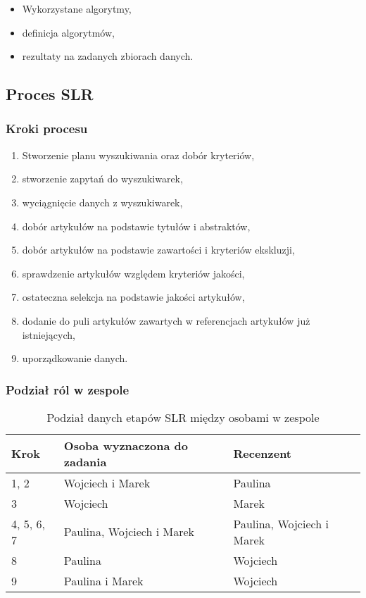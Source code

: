 \documentclass[polish,envcountsect,10pt]{article}
\begin{document}
\begin{itemize}
	\item Wykorzystane algorytmy,
	\item definicja algorytmów,
	\item rezultaty na zadanych zbiorach danych.
\end{itemize}

\subsection{Proces SLR}

\subsubsection{Kroki procesu}

\begin{enumerate}
	\item Stworzenie planu wyszukiwania oraz dobór kryteriów,
	\item stworzenie zapytań do wyszukiwarek,
	\item wyciągnięcie danych z wyszukiwarek,
	\item dobór artykułów na podstawie tytułów i abstraktów,
	\item dobór artykułów na podstawie zawartości i kryteriów ekskluzji,
	\item sprawdzenie artykułów względem kryteriów jakości,
	\item ostateczna selekcja na podstawie jakości artykułów,
	\item dodanie do puli artykułów zawartych w referencjach artykułów już istniejących,
	\item uporządkowanie danych.
\end{enumerate}

\subsubsection{Podział ról w zespole}

\begin{table}[H]
    \caption{Podział danych etapów SLR między osobami w zespole}
    \centering
    \begin{tabular}{|p{1.5cm}|p{5cm}|p{5cm}|}
        \hline
        Krok & Osoba wyznaczona do zadania & Recenzent\\
        \hline
        1, 2 & Wojciech i Marek & Paulina\\
        \hline
        3 & Wojciech & Marek\\
        \hline
        4, 5, 6, 7 & Paulina, Wojciech i Marek & Paulina, Wojciech i Marek\\
        \hline
        8 & Paulina & Wojciech\\
        \hline
        9 & Paulina i Marek & Wojciech\\
        \hline
    \end{tabular}
\end{table}
\end{document}
